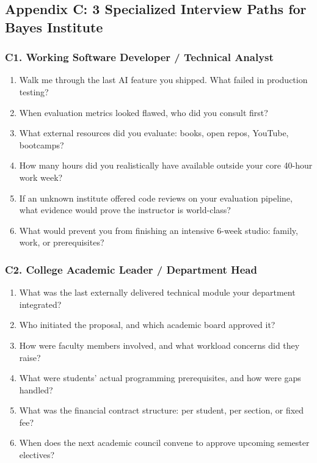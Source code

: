 \subsection*{Appendix C: 3 Specialized Interview Paths for Bayes Institute}

\subsubsection*{C1. Working Software Developer / Technical Analyst}
\begin{enumerate}[leftmargin=1.2em,itemsep=0.2ex]
  \item Walk me through the last AI feature you shipped. What failed in production testing?
  \item When evaluation metrics looked flawed, who did you consult first?
  \item What external resources did you evaluate: books, open repos, YouTube, bootcamps?
  \item How many hours did you realistically have available outside your core 40-hour work week?
  \item If an unknown institute offered code reviews on your evaluation pipeline, what evidence would prove the instructor is world-class?
  \item What would prevent you from finishing an intensive 6-week studio: family, work, or prerequisites?
\end{enumerate}

\subsubsection*{C2. College Academic Leader / Department Head}
\begin{enumerate}[leftmargin=1.2em,itemsep=0.2ex]
  \item What was the last externally delivered technical module your department integrated?
  \item Who initiated the proposal, and which academic board approved it?
  \item How were faculty members involved, and what workload concerns did they raise?
  \item What were students' actual programming prerequisites, and how were gaps handled?
  \item What was the financial contract structure: per student, per section, or fixed fee?
  \item When does the next academic council convene to approve upcoming semester electives?
\end{enumerate}

